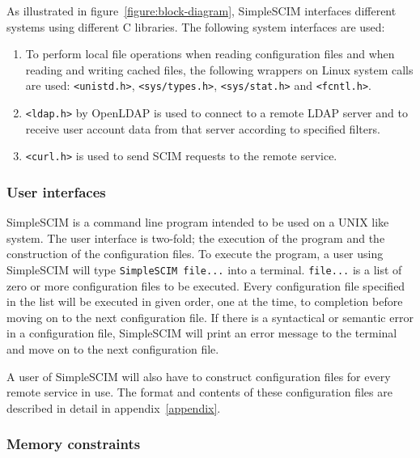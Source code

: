 \documentclass[12pt,twoside,a4paper,titlepage]{article}
\begin{document}
   As illustrated in figure~\ref{figure:block-diagram}, SimpleSCIM
   interfaces different systems using different C libraries. The
   following system interfaces are used:

   \begin{enumerate}
    \item
     To perform local file operations when reading configuration
     files and when reading and writing cached files, the following
     wrappers on Linux system calls are used: \texttt{<unistd.h>},
     \texttt{<sys/types.h>}, \texttt{<sys/stat.h>} and
     \texttt{<fcntl.h>}.

    \item
     \texttt{<ldap.h>} by OpenLDAP is used to connect to a remote
     LDAP server and to receive user account data from that server
     according to specified filters.

    \item
     \texttt{<curl.h>} is used to send SCIM requests to the remote
     service.
   \end{enumerate}

   \newpage

   \subsubsection{User interfaces}

   SimpleSCIM is a command line program intended to be used on a
   UNIX like system. The user interface is two-fold; the execution
   of the program and the construction of the configuration files.
   To execute the program, a user using SimpleSCIM will type
   \texttt{SimpleSCIM file...} into a terminal. \texttt{file...} is a
   list of zero or more configuration files to be executed. Every
   configuration file specified in the list will be executed in given
   order, one at the time, to completion before moving on to the next
   configuration file. If there is a syntactical or semantic error
   in a configuration file, SimpleSCIM will print an error message to
   the terminal and move on to the next configuration file.

   A user of SimpleSCIM will also have to construct configuration
   files for every remote service in use. The format and contents of
   these configuration files are described in detail in
   appendix~\ref{appendix}.

   \subsubsection{Memory constraints}
\end{document}
